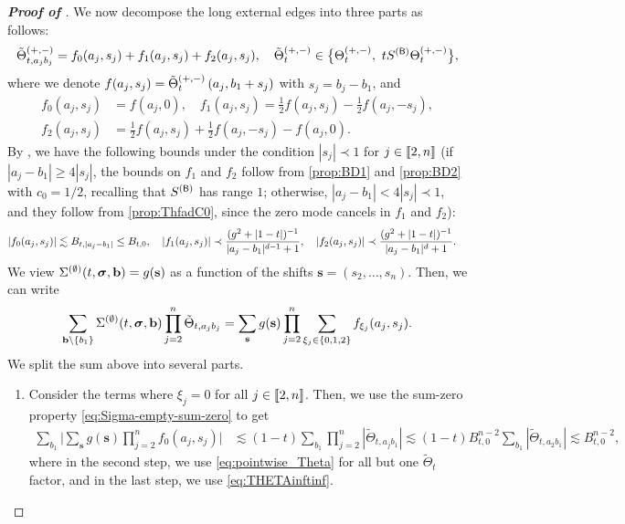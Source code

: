 \begin{proof}[\bf Proof of ]
We now decompose the long external edges into three parts as follows:
\begin{align*}
\tilde{\Theta}^{(+,-)}_{t,a_jb_j} = f_0(a_j, s_j) + f_1(a_j, s_j) + f_2(a_j, s_j), \quad \tilde{\Theta}_{t}^{(+,-)}\in \big\{\Theta^{(+,-)}_{t},\ tS^{({\mathsf{B}})}\Theta^{(+,-)}_{t}\big\}  ,
\end{align*}
where we denote $f(a_j, s_j)= \tilde{\Theta}^{(+,-)}_{t}\left({a_j,b_1+s_j}\right)$ with $s_j = b_j - b_1$, and 
\begin{align*}
    f_0(a_j, s_j) &= f(a_j, 0),\quad
    f_1(a_j, s_j) = \frac12 f(a_j, s_j) - \frac12 f(a_j, -s_j),\\
    f_2(a_j, s_j) &= \frac12 f(a_j, s_j) + \frac12 f(a_j, -s_j) - f(a_j, 0).
\end{align*}
By , we have the following bounds under the condition $|s_j|\prec 1$ for $j\in\llbracket{2,n}\rrbracket$ (if $|a_j-b_1|\ge 4|s_j|$, the bounds on $f_1$ and $f_2$ follow from \eqref{prop:BD1} and \eqref{prop:BD2} with $c_0=1/2$, recalling that $S^{({\mathsf{B}})}$ has range $1$; otherwise, $|a_j-b_1|<4|s_j|\prec 1$, and they follow from \eqref{prop:ThfadC0}, since the zero mode cancels in $f_1$ and $f_2$):
\begin{align}\label{eq:f12}
    \left|f_0(a_j, s_j)\right| &\lesssim B_{t,|a_j - b_1|} \le B_{t, 0},\quad \left|f_1(a_j, s_j)\right| \prec \frac{(g^2+|1-t|)^{-1}}{|a_j - b_1|^{d-1}+1},\quad 
    \left|f_2(a_j, s_j)\right| \prec \frac{(g^2+|1-t|)^{-1}}{|a_j - b_1|^{d}+1}.
\end{align}
We view $\Sigma^{(\emptyset)}(t, {\boldsymbol{\sigma}}, \mathbf{b}) = g(\mathbf{s})$ as a function of the shifts $\mathbf{s} = (s_2, \ldots, s_n)$. Then, we can write 
\begin{equation*}
    \sum_{\mathbf{b}\setminus \{b_1\}} \Sigma^{(\emptyset)}(t, {\boldsymbol{\sigma}}, \mathbf{b}) \prod_{j=2}^n \tilde{\Theta}_{t,a_j b_j} = \sum_{\mathbf{s}} g(\mathbf{s}) \prod_{j=2}^n \sum_{\xi_j\in\{0,1,2\}} f_{\xi_j}(a_j, s_j).
\end{equation*}
We split the sum above into several parts.
\begin{enumerate}

    \item Consider the terms where $\xi_j = 0$ for all $j\in\llbracket{2,n}\rrbracket$. Then, we use the sum-zero property \eqref{eq:Sigma-empty-sum-zero} to get 
    \begin{align*}
        \sum_{b_1}\bigg|\sum_{\mathbf{s}} g(\mathbf{s}) \prod_{j=2}^n f_{0}(a_j, s_j)\bigg| &\lesssim (1-t)\sum_{b_1}\prod_{j=2}^n \left|\tilde{\Theta}_{t,a_jb_1}\right|\lesssim (1-t) B_{t, 0}^{n-2} \sum_{b_1} \left|\tilde{\Theta}_{t,a_2b_1}\right| \lesssim B_{t, 0}^{n-2},
    \end{align*}
    where in the second step, we use \eqref{eq:pointwise_Theta} for all but one $\tilde{\Theta}_{t}$ factor, and in the last step, we use \eqref{eq:THETAinftinf}. 


\end{enumerate}
\end{proof}
